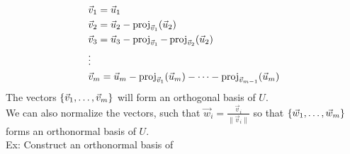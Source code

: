 \documentclass[11pt, fleqn]{article}
\begin{document}
\begin{align*}
    &\vec{v}_1=\vec{u}_1\\
    &\vec{v}_2=\vec{u}_2-\operatorname{proj}_{\vec{v}_1}(\vec{u}_2)\\
    &\vec{v}_3=\vec{u}_3-\operatorname{proj}_{\vec{v}_1}-\operatorname{proj}_{\vec{v}_2}(\vec{u}_2)\\
    &\vdots\\
    &\vec{v}_m=\vec{u}_m-\operatorname{proj}_{\vec{v}_1}(\vec{u}_m)-\cdots-\operatorname{proj}_{\vec{v}_{m-1}}(\vec{u}_m)
\end{align*}
The vectors $\left\{ \vec{v}_1,\ldots,\vec{v}_m \right\}$ will form an orthogonal basis of $U$.\\
We can also normalize the vectors, such that $\vec{w}_i=\frac{\vec{v}_i}{\|\vec{v}_i\|}$ so that $\left\{ \vec{w}_1,\ldots,\vec{w}_m \right\}$ forms an orthonormal basis of $U$.\\
Ex: Construct an orthonormal basis of
\end{document}

